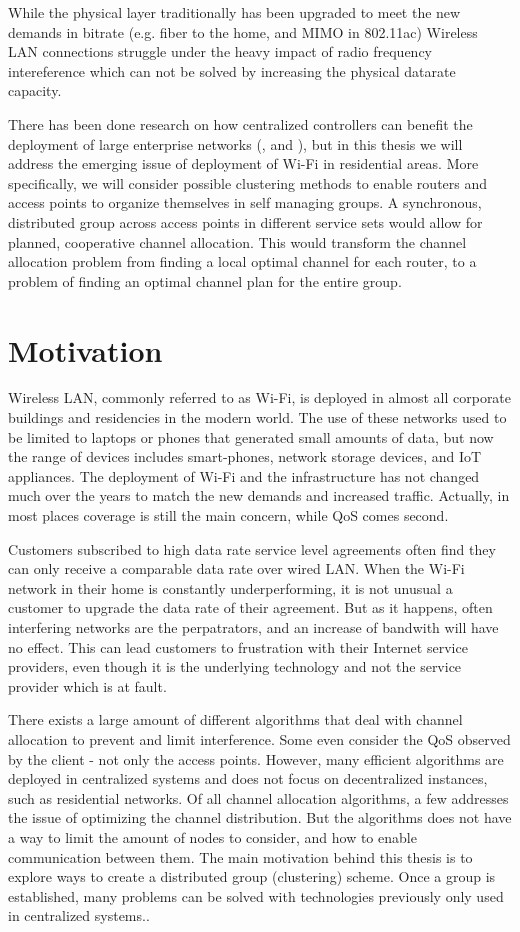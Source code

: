 While the physical layer traditionally has been upgraded to meet the new demands in bitrate (e.g. fiber to the home, 
and MIMO in 802.11ac) Wireless LAN connections struggle under the heavy impact of radio frequency intereference which can not be solved by increasing
the physical datarate capacity.

There has been done research on how centralized controllers can benefit the deployment of large enterprise networks (\cite{Murty}, \cite{Murty2} and \cite{Suresh}),
but in this thesis we will address the emerging issue of deployment of Wi-Fi in residential areas. More specifically, we will consider possible clustering methods
to enable routers and access points to organize themselves in self managing groups. A synchronous, distributed group across access points in different service sets
would allow for planned, cooperative channel allocation. This would transform the channel allocation problem from finding a local optimal channel for each router,
to a problem of finding an optimal channel plan for the entire group.

\section{Motivation}
Wireless LAN, commonly referred to as Wi-Fi, is deployed in almost all corporate buildings and residencies in the modern world.
The use of these networks used to be limited to laptops or phones that generated small amounts of data, but now the range of devices includes
smart-phones, network storage devices, and IoT appliances. The deployment of Wi-Fi and the infrastructure has not 
changed much over the years to match the new demands and increased traffic. Actually, in most places coverage is still the main concern, while
QoS comes second. 

Customers subscribed to high data rate service level agreements often find they can only receive a comparable data rate over wired LAN.
When the Wi-Fi network in their home is constantly underperforming, it is not unusual a customer to upgrade the data rate of their agreement.
But as it happens, often interfering networks are the perpatrators, and an increase of bandwith will have no effect.
This can lead customers to frustration with their Internet service providers, even though it is the underlying technology and not the service provider which is at fault.

There exists a large amount of different algorithms that deal with channel allocation to prevent and limit interference. Some even consider the QoS observed by the client - not only the access points.
However, many efficient algorithms are deployed in centralized systems and does not focus on decentralized instances, such as residential networks.
Of all channel allocation algorithms, a few addresses the issue of optimizing the channel distribution. But the algorithms does not have a way to limit the amount of nodes to consider, and how to enable
communication between them. The main motivation behind this thesis is to explore ways to create a distributed group (clustering) scheme. Once a group is established, 
many problems can be solved with technologies previously only used in centralized systems.. 

